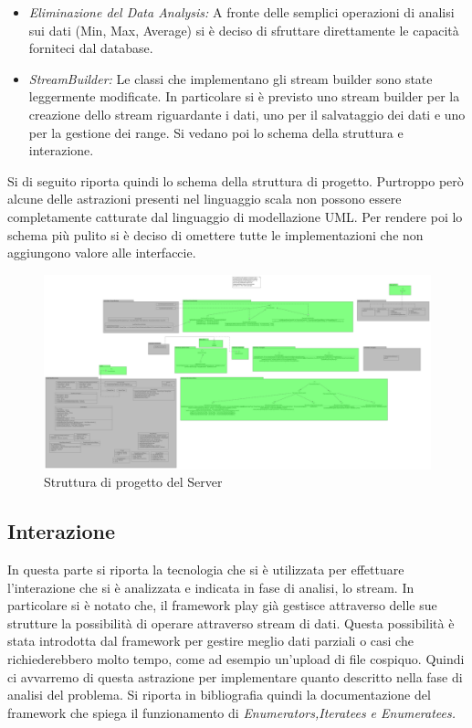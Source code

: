 \begin{itemize}
  \item \textit{Eliminazione del Data Analysis:} A fronte delle semplici operazioni di analisi sui dati (Min, Max, Average) si \`e deciso di sfruttare direttamente le capacit\`a forniteci dal database.
  \item \textit{StreamBuilder:} Le classi che implementano gli stream builder sono state leggermente modificate. In particolare si \`e previsto uno stream builder per la creazione dello stream riguardante i dati, uno per il salvataggio dei dati e uno per la gestione dei range. Si vedano poi lo schema della struttura e interazione.
\end{itemize}

Si di seguito riporta quindi lo schema della struttura di progetto. Purtroppo per\`o alcune delle astrazioni presenti nel linguaggio scala non possono essere completamente catturate dal linguaggio di modellazione UML. Per rendere poi lo schema pi\`u pulito si \`e deciso di omettere tutte le implementazioni che non aggiungono valore alle interfaccie.

\begin{figure}
\centering
\includegraphics[scale=0.1]{Figures/Project/Server/Structure/DomoticRoomServerClassDiagram}
\caption{Struttura di progetto del Server}
\end{figure}

\afterpage{\clearpage}

\newpage

\subsection{Interazione}

In questa parte si riporta la tecnologia che si \`e utilizzata per effettuare l'interazione che si \`e analizzata e indicata in fase di analisi, lo stream. In particolare si \`e notato che, il framework play\cite{PlayFramework} gi\`a gestisce attraverso delle sue strutture la possibilit\`a di operare attraverso stream di dati. Questa possibilit\`a \`e stata introdotta dal framework per gestire meglio dati parziali o casi che richiederebbero molto tempo, come ad esempio un'upload di file cospiquo. Quindi ci avvarremo di questa astrazione per implementare quanto descritto nella fase di analisi del problema. Si riporta in bibliografia quindi la documentazione del framework che spiega il funzionamento di \textit{Enumerators,Iteratees e Enumeratees.} \cite{PlayStreaming}

